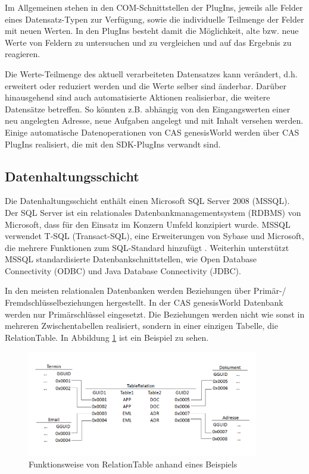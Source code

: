 Im Allgemeinen stehen in den COM-Schnittstellen der PlugIns, jeweils alle Felder eines Datensatz-Typen zur Verfügung, sowie die individuelle Teilmenge der Felder mit neuen Werten. In den PlugIns besteht damit die Möglichkeit, alte bzw. neue Werte von Feldern zu untersuchen und zu vergleichen und auf das Ergebnis zu reagieren.

Die Werte-Teilmenge des aktuell verarbeiteten Datensatzes kann verändert, d.h. erweitert oder reduziert werden und die Werte selber sind änderbar. Darüber hinausgehend sind auch automatisierte Aktionen realisierbar, die weitere Datensätze betreffen. So könnten z.B. abhängig von den Eingangswerten einer neu angelegten Adresse, neue Aufgaben angelegt und mit Inhalt versehen werden. Einige automatische Datenoperationen von CAS genesisWorld werden über CAS PlugIns realisiert, die mit den SDK-PlugIns verwandt sind.

\subsection{Datenhaltungsschicht}
\label{ch:Systemanalyse:sec:genesisWorld:subsec:db}

Die Datenhaltungsschicht enthält einen Microsoft SQL Server 2008 (MSSQL). Der SQL Server ist ein relationales Datenbankmanagementsystem (RDBMS) von Microsoft, dass für den Einsatz im Konzern Umfeld konzipiert wurde. MSSQL verwendet T-SQL (Transact-SQL), eine Erweiterungen von Sybase und Microsoft, die mehrere Funktionen zum SQL-Standard hinzufügt \cite{tech2013}. Weiterhin unterstützt MSSQL standardisierte Datenbankschnittstellen, wie Open Database Connectivity (ODBC) und Java Database Connectivity (JDBC).
  
In den meisten relationalen Datenbanken werden Beziehungen über Primär-/ Fremdschlüsselbeziehungen hergestellt. In der CAS genesisWorld Datenbank werden nur Primärschlüssel eingesetzt. Die Beziehungen werden nicht wie sonst in mehreren Zwischentabellen realisiert, sondern in einer einzigen Tabelle, die RelationTable. In Abbildung \ref{gw_2} ist ein Beispiel zu sehen.

\begin{figure}[ht]
	\centering
  \includegraphics[width=0.9\textwidth, width=0.9\textwidth]{pics/gW_tablerealtion.png}
	\caption{Funktionsweise von RelationTable anhand eines Beispiels}
	\label{gw_2}
\end{figure}

